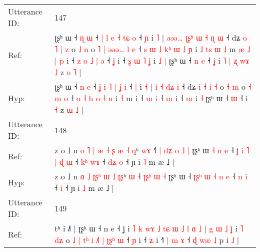 \documentclass[10pt]{article}
\DeclareRobustCommand{\hl}[1]{{\textcolor{red}{#1}}}
\begin{document}
\begin{longtable}{ll}
 \\
\midrule
Utterance ID: & 147 \\
Ref: & ʈʂʰ ɯ ˧ \hl{ɳ} \hl{ɯ} ˧ \hl{|} \hl{l} \hl{e} \hl{˧} \hl{t}\hl{ɕ} \hl{o} ˧ \hl{ɲ} i \hl{˥} |\hl{ }\hl{ə}\hl{ə}\hl{ə}\hl{…} \hl{ʈ}\hl{ʂ}\hl{ʰ} \hl{ɯ} \hl{˧}\hl{ }\hl{ɳ} \hl{ɯ} ˧ dʑ \hl{o} \hl{˥} \hl{|} \hl{z} o \hl{˩} \hl{n} o\hl{ }\hl{˥}\hl{ }\hl{|} \hl{ə}\hl{ə}\hl{ə}\hl{…} \hl{l} \hl{e} ˧\hl{ }\hl{s} \hl{ɯ} \hl{˩} \hl{k}\hl{ʰ} \hl{ɯ} \hl{˩} \hl{ɲ} i\hl{ }\hl{˩}\hl{ }\hl{t}\hl{s}\hl{ }\hl{ɯ} \hl{˩} m\hl{ }\hl{æ}\hl{ }\hl{˩}\hl{ }\hl{|}\hl{ }\hl{p} i ˧\hl{ }\hl{z}\hl{ }\hl{o}\hl{ }\hl{˩} \hl{|} \hl{ə} ˧ \hl{ʝ} i ˧\hl{ }\hl{ʂ}\hl{ }\hl{ɯ}\hl{ }\hl{˥} \hl{ʝ} i\hl{ }\hl{˩} \hl{|} ʈʂʰ ɯ ˧\hl{ }\hl{n} \hl{e} ˧\hl{ }\hl{ʝ} i\hl{ }\hl{˥}\hl{ }\hl{|}\hl{ }\hl{ʐ}\hl{ }\hl{w}\hl{ɤ} \hl{˩} z \hl{o} \hl{˥} |
 \\
Hyp: & ʈʂʰ ɯ ˧ \hl{n} \hl{e} ˧ \hl{ʝ} \hl{i} \hl{˥} \hl{|} \hl{}\hl{ʝ} \hl{i} ˧ \hl{|} i \hl{˧} |\hl{}\hl{}\hl{}\hl{}\hl{} \hl{}\hl{}\hl{i} \hl{˧} \hl{}\hl{d}\hl{ʑ} \hl{i} ˧ dʑ \hl{i} \hl{˧} \hl{i} \hl{˧} o \hl{˧} \hl{m} o\hl{}\hl{}\hl{}\hl{} \hl{}\hl{}\hl{}\hl{˧} \hl{m} \hl{o} ˧\hl{}\hl{} \hl{o} \hl{˧} \hl{}\hl{h} \hl{o} \hl{˧} \hl{n} i\hl{}\hl{}\hl{}\hl{}\hl{}\hl{}\hl{} \hl{˧} m\hl{}\hl{}\hl{}\hl{}\hl{}\hl{}\hl{}\hl{} i ˧\hl{}\hl{}\hl{}\hl{}\hl{}\hl{} \hl{m} \hl{i} ˧ \hl{m} i ˧\hl{}\hl{}\hl{}\hl{}\hl{}\hl{} \hl{m} i\hl{}\hl{} \hl{˧} ʈʂʰ ɯ ˧\hl{}\hl{} \hl{ɯ} ˧\hl{}\hl{} i\hl{}\hl{}\hl{}\hl{}\hl{}\hl{}\hl{}\hl{}\hl{} \hl{˧} z \hl{ɯ} \hl{˩} |
 \\
\midrule
Utterance ID: & 148 \\
Ref: & z o ˩ n\hl{ }\hl{o} \hl{˥} \hl{|} \hl{æ}\hl{ }\hl{˧} \hl{ʂ} \hl{æ} \hl{˧}\hl{ }\hl{q}ʰ \hl{w}\hl{ɤ} ˧\hl{˥}\hl{ }\hl{|} \hl{d}\hl{ʑ}\hl{ }\hl{o} \hl{˩} \hl{|} ʈʂʰ ɯ\hl{ }\hl{˧}\hl{ }\hl{n}\hl{ }\hl{e} ˧ \hl{ʝ}\hl{ }\hl{i} \hl{˥} \hl{|} \hl{ɖ} \hl{ɯ} ˧ \hl{k}\hl{ʰ} \hl{w}\hl{ɤ} ˧\hl{ }\hl{d}\hl{ʑ} \hl{o} ˧ ɲ i \hl{˥} m æ ˩ |
 \\
Hyp: & z o ˩ n\hl{}\hl{} \hl{ɑ} \hl{˩} \hl{ʈ}\hl{ʂ}\hl{ʰ} \hl{ɯ} \hl{˩} \hl{}\hl{ʈ}\hl{ʂ}ʰ \hl{}\hl{ɯ} ˧\hl{}\hl{}\hl{} \hl{}\hl{ʈ}\hl{ʂ}\hl{ʰ} \hl{ɯ} \hl{˧} ʈʂʰ ɯ\hl{}\hl{}\hl{}\hl{}\hl{}\hl{} ˧ \hl{ʈ}\hl{ʂ}\hl{ʰ} \hl{ɯ} \hl{˧} \hl{n} \hl{e} ˧ \hl{}\hl{n} \hl{}\hl{i} ˧\hl{}\hl{}\hl{} \hl{i} ˧ ɲ i \hl{˩} m æ ˩ |
 \\
\midrule
Utterance ID: & 149 \\
Ref: & tʰ i ˩˥ | ʈʂʰ ɯ ˧ n e ˧ ʝ i\hl{ }\hl{˥}\hl{ }\hl{k}\hl{ }\hl{w}\hl{ɤ}\hl{ }\hl{˩}\hl{ }\hl{t}\hl{ɕ}\hl{ }\hl{ɯ}\hl{ }\hl{˩}\hl{ }\hl{l}\hl{ }\hl{ɑ} \hl{˩} |\hl{ }\hl{g} \hl{ɯ} \hl{˩} \hl{ʝ} i \hl{˥} \hl{d}\hl{ʑ} o\hl{ }\hl{˩}\hl{ }\hl{|} \hl{t}\hl{ʰ} \hl{i} \hl{˩}\hl{˥} \hl{|} \hl{ʈ}\hl{ʂ}\hl{ʰ} \hl{ɯ} ˧ \hl{ɲ} i ˧ \hl{ʑ} i ˧\hl{˥} \hl{|}\hl{ }\hl{m} \hl{ɤ} ˧\hl{ }\hl{ɖ} \hl{w}\hl{æ} \hl{˩} p i \hl{˩} |

\end{longtable}
\end{document}
